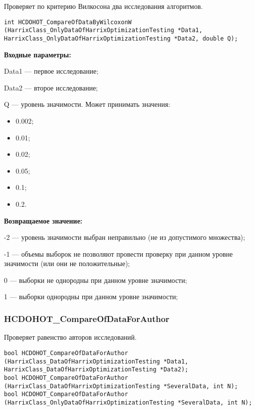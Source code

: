 \documentclass[a4paper,12pt]{article}
\begin{document}
Проверяет по критерию Вилкосона два исследования алгоритмов.


\begin{lstlisting}[label=code_syntax_HCDOHOT_CompareOfDataByWilcoxonW,caption=Синтаксис]
int HCDOHOT_CompareOfDataByWilcoxonW (HarrixClass_OnlyDataOfHarrixOptimizationTesting *Data1, HarrixClass_OnlyDataOfHarrixOptimizationTesting *Data2, double Q);
\end{lstlisting}

\textbf{Входные параметры:}


Data1 --- первое исследование;

Data2 --- второе исследование;

Q --- уровень значимости. Может принимать значения:

\begin{itemize}
	\item 0.002; 
	\item 0.01; 
	\item 0.02; 
	\item 0.05; 
	\item 0.1; 
	\item 0.2.
\end{itemize}

\textbf{Возвращаемое значение:}


-2 --- уровень значимости выбран неправильно (не из допустимого множества);

-1 --- объемы выборок не позволяют провести проверку при данном уровне значимости (или они не положительные);

0 --- выборки не однородны  при данном уровне значимости;

1 --- выборки однородны  при данном уровне значимости;


\subsubsection{HCDOHOT\_CompareOfDataForAuthor}\label{HCDOHOT_CompareOfDataForAuthor}

Проверяет равенство авторов исследований.


\begin{lstlisting}[label=code_syntax_HCDOHOT_CompareOfDataForAuthor,caption=Синтаксис]
bool HCDOHOT_CompareOfDataForAuthor (HarrixClass_DataOfHarrixOptimizationTesting *Data1, HarrixClass_DataOfHarrixOptimizationTesting *Data2);
bool HCDOHOT_CompareOfDataForAuthor (HarrixClass_DataOfHarrixOptimizationTesting *SeveralData, int N);
bool HCDOHOT_CompareOfDataForAuthor (HarrixClass_OnlyDataOfHarrixOptimizationTesting *SeveralData, int N);
\end{lstlisting}
\end{document}
